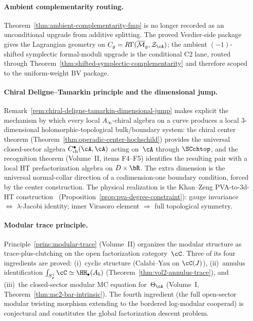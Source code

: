 \paragraph{Ambient complementarity routing.}
Theorem~\ref{thm:ambient-complementarity-fmp} is no longer recorded
as an unconditional upgrade from additive splitting. The proved
Verdier-side package gives the Lagrangian geometry on
$C_g = R\Gamma(\overline{\mathcal{M}}_g,\mathcal{Z}_\cA)$; the
ambient $(-1)$-shifted symplectic formal-moduli upgrade is the
conditional C2 lane, routed through
Theorem~\ref{thm:shifted-symplectic-complementarity} and therefore
scoped to the uniform-weight BV package.

\paragraph{Chiral Deligne--Tamarkin principle and the dimensional jump.}
Remark~\ref{rem:chiral-deligne-tamarkin-dimensional-jump} makes
explicit the mechanism by which every local $A_\infty$-chiral algebra
on a curve produces a local $3$-dimensional holomorphic-topological
bulk/boundary system: the chiral center theorem
(Theorem~\ref{thm:operadic-center-hochschild}) provides the
universal closed-sector algebra
$C^\bullet_{\mathrm{ch}}(\cA,\cA)$ acting on~$\cA$ through
$\SCchtop$, and the recognition theorem (Volume~II, items F4--F5)
identifies the resulting pair with a local HT prefactorization
algebra on $D \times \bR$. The extra dimension is the universal
normal-collar direction of a codimension-one boundary condition,
forced by the center construction. The physical realization is the
Khan--Zeng PVA-to-3d-HT construction~\cite{KhanZeng25}
(Proposition~\ref{prop:pva-degree-constraint}): gauge invariance
$\Leftrightarrow$ $\lambda$-Jacobi identity; inner Virasoro element
$\Rightarrow$ full topological symmetry.

\paragraph{Modular trace principle.}
Principle~\ref{princ:modular-trace} (Volume~II) organizes the modular
structure as trace-plus-clutching on the open factorization
category~$\cC$. Three of its four ingredients are proved: (i)~cyclic
structure (Calabi--Yau on $\cC(J)$), (ii)~annulus identification
$\int_{S^1_p} \cC \simeq \HH_\bullet(A_b)$
(Theorem~\ref{thm:vol2-annulus-trace}), and (iii)~the closed-sector
modular MC equation for~$\Theta_\cA$
(Volume~I, Theorem~\ref{thm:mc2-bar-intrinsic}). The fourth
ingredient (the full open-sector modular twisting morphism extending
to the bordered log-modular cooperad) is conjectural and constitutes
the global factorization descent problem.

